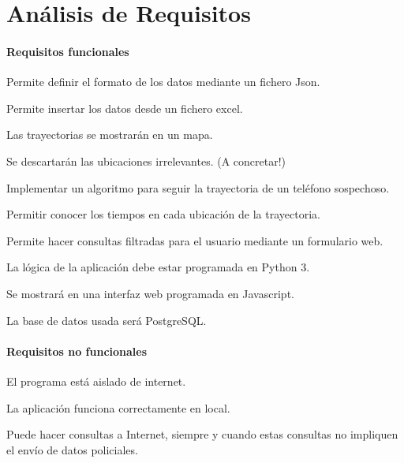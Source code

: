 \section{Análisis de Requisitos\label{SEC:ANALISIS}}
  \paragraph{Requisitos funcionales}
  
  \begin{functional}
    \item Permite definir el formato de los datos mediante un fichero Json.
    \item Permite insertar los datos desde un fichero excel.

    \begin{functional}
      \item Las trayectorias se mostrarán en un mapa.
      \item Se descartarán las ubicaciones irrelevantes. (A concretar!)
    \end{functional}
    \item Implementar un algoritmo para seguir la trayectoria de un teléfono sospechoso.
    
    \item Permitir conocer los tiempos en cada ubicación de la trayectoria.
    
    \item Permite hacer consultas filtradas para el usuario mediante un formulario web.
    
    \item La lógica de la aplicación debe estar programada en Python 3.
    
    \item Se mostrará en una interfaz web programada en Javascript.
    
    \item La base de datos usada será PostgreSQL.        
  \end{functional}
  
  \paragraph{Requisitos no funcionales}
  
  \begin{nonfunctional}
    \item El programa está aislado de internet.
    \begin{nonfunctional}
      \item La aplicación funciona correctamente en local.
      \item Puede hacer consultas a Internet, siempre y cuando estas consultas no impliquen el envío de datos policiales.
    \end{nonfunctional}
  \end{nonfunctional}